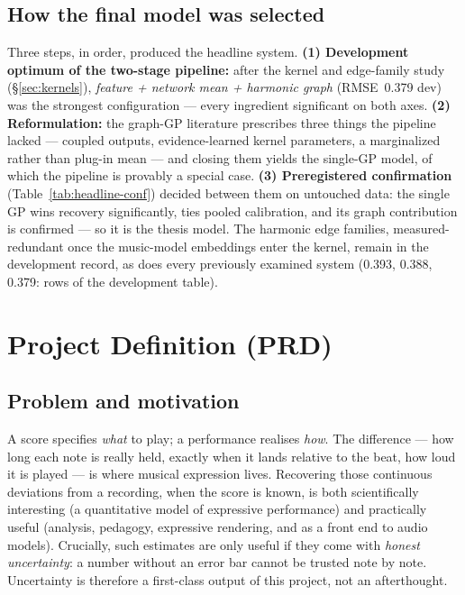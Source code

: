 \documentclass[11pt,a4paper]{report}
\newcommand{\rmseNetGraph}{0.393}      %
\newcommand{\rmseStack}{0.388}         %
\newcommand{\rmseHeadline}{0.379}      %
\newcommand{\rmseGP}{0.376}            %
\begin{document}
\section{How the final model was selected}
Three steps, in order, produced the headline system. \textbf{(1) Development
optimum of the two-stage pipeline:} after the kernel and edge-family study
(\S\ref{sec:kernels}), \emph{feature + network mean + harmonic graph}
(RMSE~\rmseHeadline{} dev) was the strongest configuration --- every ingredient
significant on both axes. \textbf{(2) Reformulation:} the graph-GP literature
prescribes three things the pipeline lacked --- coupled outputs, evidence-learned
kernel parameters, a marginalized rather than plug-in mean --- and closing them
yields the single-GP model, of which the pipeline is provably a special case.
\textbf{(3) Preregistered confirmation} (Table~\ref{tab:headline-conf}) decided
between them on untouched data: the single GP wins recovery significantly, ties
pooled calibration, and its graph contribution is confirmed --- so it is the
thesis model. The harmonic edge families, measured-redundant once the music-model
embeddings enter the kernel, remain in the development record, as does every
previously examined system (\rmseNetGraph, \rmseStack, \rmseHeadline: rows of the
development table).


\chapter{Project Definition (PRD)}\label{ch:prd}

\section{Problem and motivation}
A score specifies \emph{what} to play; a performance realises \emph{how}. The
difference --- how long each note is really held, exactly when it lands relative to
the beat, how loud it is played --- is where musical expression lives. Recovering
those continuous deviations from a recording, when the score is known, is both
scientifically interesting (a quantitative model of expressive performance) and
practically useful (analysis, pedagogy, expressive rendering, and as a front end to
audio models). Crucially, such estimates are only useful if they come with
\emph{honest uncertainty}: a number without an error bar cannot be trusted note by
note. Uncertainty is therefore a first-class output of this project, not an
afterthought.
\end{document}
